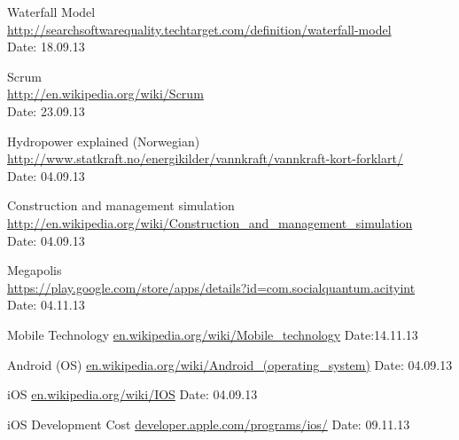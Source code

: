 \begin{thebibliography}{99}
	Waterfall Model \\
	\href {http://searchsoftwarequality.techtarget.com/definition/waterfall-model}{http://searchsoftwarequality.techtarget.com/definition/waterfall-model} \\
	Date: 18.09.13

	Scrum \\ 
	\href{http://en.wikipedia.org/wiki/Scrum}{http://en.wikipedia.org/wiki/Scrum} \\
	Date: 23.09.13

	Hydropower explained (Norwegian) \\
	\href {http://www.statkraft.no/energikilder/vannkraft/vannkraft-kort-forklart/}{http://www.statkraft.no/energikilder/vannkraft/vannkraft-kort-forklart/} \\
	Date: 04.09.13


	Construction and management simulation \\
	\href {http://en.wikipedia.org/wiki/Construction_and_management_simulation}{http://en.wikipedia.org/wiki/Construction\_and\_management\_simulation} \\
	Date: 04.09.13

	Megapolis \\
	\href {https://play.google.com/store/apps/details?id=com.socialquantum.acityint}{https://play.google.com/store/apps/details?id=com.socialquantum.acityint} \\
	Date: 04.11.13

	Mobile Technology\newline
	\href{http://en.wikipedia.org/wiki/Mobile_technology}{en.wikipedia.org/wiki/Mobile\_technology}\newline
	Date:14.11.13

	Android (OS)\newline
	\href {http://en.wikipedia.org/wiki/Android\_(operating_system)}{en.wikipedia.org/wiki/Android\_(operating\_system)}\newline
	Date: 04.09.13

	iOS\newline
	\href {http://en.wikipedia.org/wiki/IOS}{en.wikipedia.org/wiki/IOS}\newline
	Date: 04.09.13

	iOS Development Cost\newline
	\href {https://developer.apple.com/programs/ios/}{developer.apple.com/programs/ios/}\newline
	Date: 09.11.13


\end{thebibliography}
